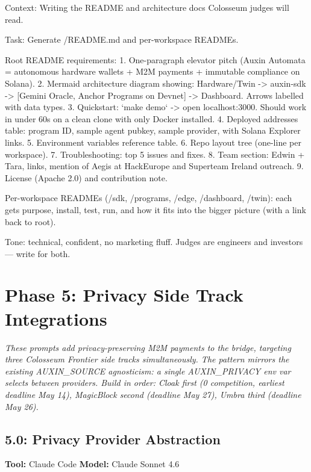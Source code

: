 \documentclass[11pt, a4paper]{article}
\begin{document}
\begin{promptbox}
Context: Writing the README and architecture docs Colosseum judges will read.

Task: Generate /README.md and per-workspace READMEs.

Root README requirements:
1. One-paragraph elevator pitch (Auxin Automata = autonomous hardware wallets + M2M payments + immutable compliance on Solana).
2. Mermaid architecture diagram showing: Hardware/Twin -> auxin-sdk -> [Gemini Oracle, Anchor Programs on Devnet] -> Dashboard. Arrows labelled with data types.
3. Quickstart: `make demo` -> open localhost:3000. Should work in under 60s on a clean clone with only Docker installed.
4. Deployed addresses table: program ID, sample agent pubkey, sample provider, with Solana Explorer links.
5. Environment variables reference table.
6. Repo layout tree (one-line per workspace).
7. Troubleshooting: top 5 issues and fixes.
8. Team section: Edwin + Tara, links, mention of Aegis at HackEurope and Superteam Ireland outreach.
9. License (Apache 2.0) and contribution note.

Per-workspace READMEs (/sdk, /programs, /edge, /dashboard, /twin): each gets purpose, install, test, run, and how it fits into the bigger picture (with a link back to root).

Tone: technical, confident, no marketing fluff. Judges are engineers and investors --- write for both.
\end{promptbox}

\newpage
\section{Phase 5: Privacy Side Track Integrations}
\textit{These prompts add privacy-preserving M2M payments to the bridge, targeting three Colosseum Frontier side tracks simultaneously. The pattern mirrors the existing AUXIN\_SOURCE agnosticism: a single AUXIN\_PRIVACY env var selects between providers. Build in order: Cloak first (0 competition, earliest deadline May 14), MagicBlock second (deadline May 27), Umbra third (deadline May 26).}

\subsection*{5.0: Privacy Provider Abstraction}
\textbf{Tool:} Claude Code \quad \textbf{Model:} Claude Sonnet 4.6
\end{document}
